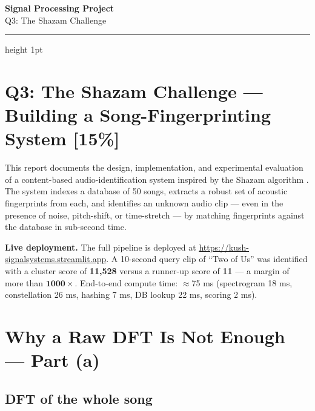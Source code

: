\documentclass[11pt,a4paper]{article}
\begin{document}
\begin{center}
  {\LARGE\bfseries Signal Processing Project}\\[4pt]
  {\normalsize Q3: The Shazam Challenge}\\[2pt]
  {\normalsize }
\end{center}
\vspace{2pt}
\hrule height 1pt
\vspace{10pt}

\section*{\color{titlegreen}Q3: The Shazam Challenge — Building a Song-Fingerprinting System [15\%]}

This report documents the design, implementation, and experimental evaluation of a content-based
audio-identification system inspired by the Shazam algorithm
\cite{Wang2003}. The system indexes a database of 50 songs, extracts a robust set of
acoustic fingerprints from each, and identifies an unknown audio clip — even in the
presence of noise, pitch-shift, or time-stretch — by matching fingerprints against the
database in sub-second time.

\vspace{4pt}
\begin{mdframed}[style=insightbox]
\textbf{\color{boxgreen}Live deployment.}
The full pipeline is deployed at
\url{https://kush-signalsystems.streamlit.app}.
A 10-second query clip of ``Two of Us'' was identified with a cluster score of
\textbf{11{,}528} versus a runner-up score of \textbf{11} — a margin of more than
\(\mathbf{1000\times}\). End-to-end compute time: $\approx$75 ms
(spectrogram 18 ms, constellation 26 ms, hashing 7 ms, DB lookup 22 ms, scoring 2 ms).
\end{mdframed}

\section{Why a Raw DFT Is Not Enough — Part (a)}

\subsection{DFT of the whole song}
\end{document}
